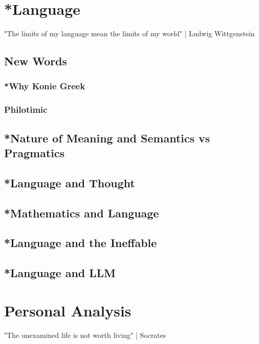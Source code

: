 
\chapter{*Language}
"The limits of my language mean the limits of my world" | Ludwig Wittgenstein
\section{New Words}
\subsection{*Why Konie Greek}
\subsection{Philotimic}
\section{*Nature of Meaning and Semantics vs Pragmatics}
\section{*Language and Thought}
\section{*Mathematics and Language}
\section{*Language and the Ineffable}
\section{*Language and LLM}
\chapter{Personal Analysis}
"The unexamined life is not worth living" | Socrates
